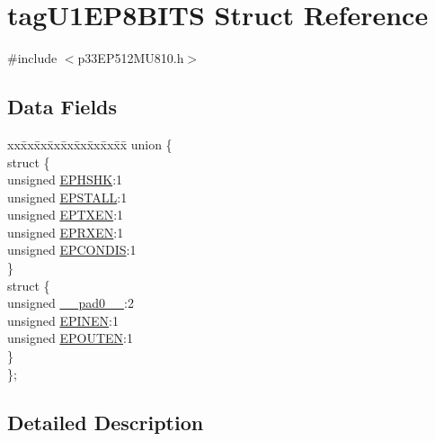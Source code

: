 \hypertarget{structtag_u1_e_p8_b_i_t_s}{}\section{tag\+U1\+E\+P8\+B\+I\+TS Struct Reference}
\label{structtag_u1_e_p8_b_i_t_s}


{\ttfamily \#include $<$p33\+E\+P512\+M\+U810.\+h$>$}

\subsection*{Data Fields}
\begin{DoxyCompactItemize}
\item 
\begin{tabbing}
xx\=xx\=xx\=xx\=xx\=xx\=xx\=xx\=xx\=\kill
union \{\\
\>struct \{\\
\>\>unsigned \hyperlink{structtag_u1_e_p8_b_i_t_s_a0d06430217cb4b189fbe9d0c4b460482}{EPHSHK}:1\\
\>\>unsigned \hyperlink{structtag_u1_e_p8_b_i_t_s_a47042104f04ebe06a23f9789bd400d7e}{EPSTALL}:1\\
\>\>unsigned \hyperlink{structtag_u1_e_p8_b_i_t_s_aa2d88c1be513e759c136823c86a355b4}{EPTXEN}:1\\
\>\>unsigned \hyperlink{structtag_u1_e_p8_b_i_t_s_a8a388d32ceffb87230e660b6793f2857}{EPRXEN}:1\\
\>\>unsigned \hyperlink{structtag_u1_e_p8_b_i_t_s_a1bd26df05d2b5a11b20ee548fce90c3e}{EPCONDIS}:1\\
\>\} \\
\>struct \{\\
\>\>unsigned \hyperlink{structtag_u1_e_p8_b_i_t_s_adf71f3d8410c1f1dbbc96680a92c49af}{\_\_pad0\_\_}:2\\
\>\>unsigned \hyperlink{structtag_u1_e_p8_b_i_t_s_a8b6d98cdf233ac90ff19d16d9a89215e}{EPINEN}:1\\
\>\>unsigned \hyperlink{structtag_u1_e_p8_b_i_t_s_adf87e8acfbb27a5626e21b3e3bd106fd}{EPOUTEN}:1\\
\>\} \\
\}; \\

\end{tabbing}\end{DoxyCompactItemize}


\subsection{Detailed Description}



